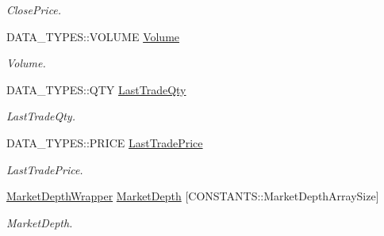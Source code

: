 \begin{DoxyCompactItemize}
\begin{DoxyCompactList}\small\item\em Close\-Price. \end{DoxyCompactList}\item 
\hypertarget{class_a_p_i2_1_1_d_a_t_a___s_t_r_u_c_t_s_1_1_market_data_wrapper_ab6b0b076e2b2138b23f0c1b6b0ea21ae}{D\-A\-T\-A\-\_\-\-T\-Y\-P\-E\-S\-::\-V\-O\-L\-U\-M\-E \hyperlink{class_a_p_i2_1_1_d_a_t_a___s_t_r_u_c_t_s_1_1_market_data_wrapper_ab6b0b076e2b2138b23f0c1b6b0ea21ae}{Volume}}\label{class_a_p_i2_1_1_d_a_t_a___s_t_r_u_c_t_s_1_1_market_data_wrapper_ab6b0b076e2b2138b23f0c1b6b0ea21ae}

\begin{DoxyCompactList}\small\item\em Volume. \end{DoxyCompactList}\item 
\hypertarget{class_a_p_i2_1_1_d_a_t_a___s_t_r_u_c_t_s_1_1_market_data_wrapper_a101789ded1f9fcd39a4aa8cb48abb48b}{D\-A\-T\-A\-\_\-\-T\-Y\-P\-E\-S\-::\-Q\-T\-Y \hyperlink{class_a_p_i2_1_1_d_a_t_a___s_t_r_u_c_t_s_1_1_market_data_wrapper_a101789ded1f9fcd39a4aa8cb48abb48b}{Last\-Trade\-Qty}}\label{class_a_p_i2_1_1_d_a_t_a___s_t_r_u_c_t_s_1_1_market_data_wrapper_a101789ded1f9fcd39a4aa8cb48abb48b}

\begin{DoxyCompactList}\small\item\em Last\-Trade\-Qty. \end{DoxyCompactList}\item 
\hypertarget{class_a_p_i2_1_1_d_a_t_a___s_t_r_u_c_t_s_1_1_market_data_wrapper_a94a0d4c20f48e8a948eea9ed067c5e2a}{D\-A\-T\-A\-\_\-\-T\-Y\-P\-E\-S\-::\-P\-R\-I\-C\-E \hyperlink{class_a_p_i2_1_1_d_a_t_a___s_t_r_u_c_t_s_1_1_market_data_wrapper_a94a0d4c20f48e8a948eea9ed067c5e2a}{Last\-Trade\-Price}}\label{class_a_p_i2_1_1_d_a_t_a___s_t_r_u_c_t_s_1_1_market_data_wrapper_a94a0d4c20f48e8a948eea9ed067c5e2a}

\begin{DoxyCompactList}\small\item\em Last\-Trade\-Price. \end{DoxyCompactList}\item 
\hypertarget{class_a_p_i2_1_1_d_a_t_a___s_t_r_u_c_t_s_1_1_market_data_wrapper_a8519b80b828d7678fd7a69bd634eca4f}{\hyperlink{class_a_p_i2_1_1_d_a_t_a___s_t_r_u_c_t_s_1_1_market_depth_wrapper}{Market\-Depth\-Wrapper} \hyperlink{class_a_p_i2_1_1_d_a_t_a___s_t_r_u_c_t_s_1_1_market_data_wrapper_a8519b80b828d7678fd7a69bd634eca4f}{Market\-Depth} \mbox{[}C\-O\-N\-S\-T\-A\-N\-T\-S\-::\-Market\-Depth\-Array\-Size\mbox{]}}\label{class_a_p_i2_1_1_d_a_t_a___s_t_r_u_c_t_s_1_1_market_data_wrapper_a8519b80b828d7678fd7a69bd634eca4f}

\begin{DoxyCompactList}\small\item\em Market\-Depth. \end{DoxyCompactList}\end{DoxyCompactItemize}


